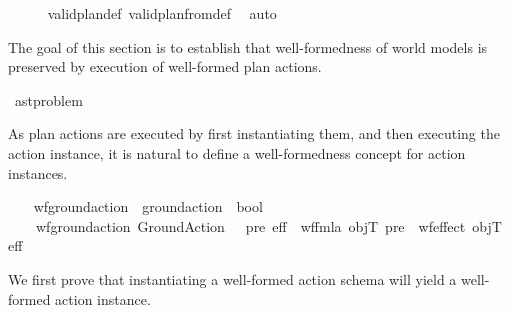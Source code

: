 \begin{isabellebody}
%
\isadelimproof
\ \ \ \ %
\endisadelimproof
%
\isatagproof
{}\isamarkupfalse%
\ valid{\isacharunderscore}{\kern0pt}plan{}{\isacharunderscore}{\kern0pt}def\ valid{\isacharunderscore}{\kern0pt}plan{\isacharunderscore}{\kern0pt}from{}{\isacharunderscore}{\kern0pt}def\ \isamarkupfalse%
\ auto%
\endisatagproof
{\isafoldproof}%
%
\isadelimproof
\isanewline
%
\endisadelimproof
\isanewline
{}\isamarkupfalse%
\ %
%
\isadelimdocument
%
\endisadelimdocument
%
\isatagdocument
%
\isamarkuptrue%
%
\isamarkuptrue%
%
\endisatagdocument
{\isafolddocument}%
%
\isadelimdocument
%
\endisadelimdocument
%
\begin{isamarkuptext}%
The goal of this section is to establish that well-formedness of
  world models is preserved by execution of well-formed plan actions.%
\end{isamarkuptext}\isamarkuptrue%
\isamarkupfalse%
\ ast{\isacharunderscore}{\kern0pt}problem\ %
\begin{isamarkuptext}%
As plan actions are executed by first instantiating them, and then
    executing the action instance, it is natural to define a well-formedness
    concept for action instances.%
\end{isamarkuptext}\isamarkuptrue%
\ \ \isamarkupfalse%
\ wf{\isacharunderscore}{\kern0pt}ground{\isacharunderscore}{\kern0pt}action\ {\isacharcolon}{\kern0pt}{\isacharcolon}{\kern0pt}\ {\isachardoublequoteopen}ground{\isacharunderscore}{\kern0pt}action\ {\isasymRightarrow}\ bool{\isachardoublequoteclose}\ \isanewline
\ \ \ \ {\isachardoublequoteopen}wf{\isacharunderscore}{\kern0pt}ground{\isacharunderscore}{\kern0pt}action\ {\isacharparenleft}{\kern0pt}Ground{\isacharunderscore}{\kern0pt}Action\ {\isacharunderscore}{\kern0pt}\ {\isacharunderscore}{\kern0pt}\ pre\ eff{\isacharparenright}{\kern0pt}\ {\isasymlongleftrightarrow}\ {\isacharparenleft}{\kern0pt}wf{\isacharunderscore}{\kern0pt}fmla\ objT\ pre\ {\isasymand}\ wf{\isacharunderscore}{\kern0pt}effect\ objT\ eff{\isacharparenright}{\kern0pt}{\isachardoublequoteclose}%
\begin{isamarkuptext}%
We first prove that instantiating a well-formed action schema will yield
    a well-formed action instance.


\end{isamarkuptext}
\end{isabellebody}
